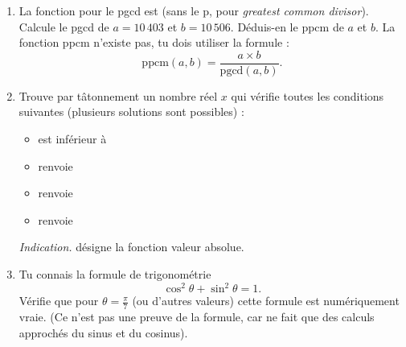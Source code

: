 \documentclass[11pt,class=report,crop=false]{standalone}
\begin{document}
\begin{activite}


\begin{enumerate}
  \item  La fonction \Python{} pour le pgcd est  (sans le \og{}p\fg{}, pour \emph{greatest common divisor}). Calcule le pgcd de $a = 10\,403$ et $b = 10\,506$. Déduis-en le ppcm de $a$ et $b$. La fonction ppcm n'existe pas, tu dois utiliser la formule :
  $$\text{ppcm}(a,b) = \frac{a \times b}{\text{pgcd}(a,b)}.$$
  
  \item Trouve par tâtonnement un nombre réel $x$ qui vérifie toutes les conditions suivantes (plusieurs solutions sont possibles) :
  \begin{itemize}
    \item {} est inférieur à 
    \item {} renvoie 
    \item {} renvoie 
    \item {} renvoie  
  \end{itemize}
 
  \emph{Indication.}  désigne la fonction valeur absolue.
  
  \item Tu connais la formule de trigonométrie 
  $$\cos^2 \theta + \sin^2 \theta = 1.$$
  Vérifie que pour $\theta = \frac\pi7$ (ou d'autres valeurs) cette formule est numériquement vraie. (Ce n'est pas une preuve de la formule, car \Python{} ne fait que des calculs approchés du sinus et du cosinus).
\end{enumerate}  
\end{activite}

\end{document}
